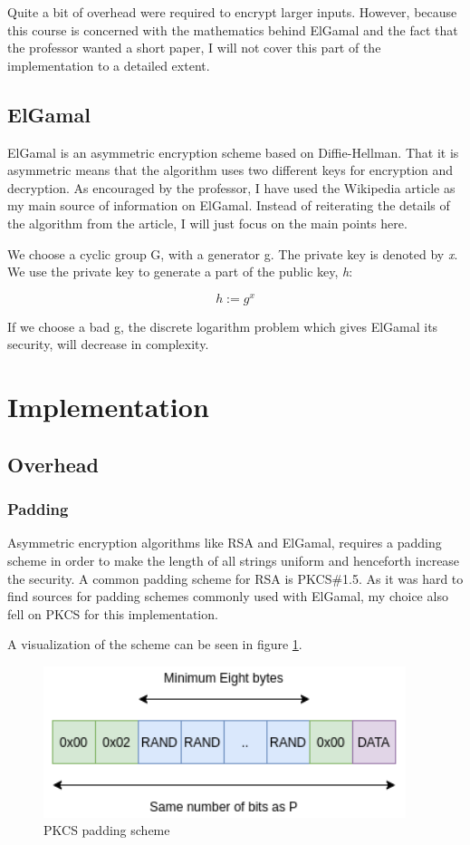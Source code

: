 \documentclass{article}
\begin{document}
Quite a bit of overhead were required to encrypt larger inputs. However, because this course is concerned with the mathematics behind ElGamal and the fact that the professor wanted a short paper, I will not cover this part of the implementation to a detailed extent. 


\subsection{ElGamal}
ElGamal is an asymmetric encryption scheme based on Diffie-Hellman. That it is asymmetric means that the algorithm uses two different keys for encryption and decryption. As encouraged by the professor, I have used the Wikipedia article\cite{WIKI} as my main source of information on ElGamal. Instead of reiterating the details of the algorithm from the article, I will just focus on the main points here. 

We choose a cyclic group G, with a generator g. The private key is denoted by \textit{x}. We use the private key to generate a part of the public key, \textit{h}:

\begin{equation}
h := g^{x}
\end{equation}

If we choose a bad g, the discrete logarithm problem which gives ElGamal its security, will decrease in complexity. 

\section{Implementation}


\subsection{Overhead}

\subsubsection{Padding}
Asymmetric encryption algorithms like RSA and ElGamal, requires a padding scheme in order to make the length of all strings uniform and henceforth increase the security. A common padding scheme for RSA is PKCS\#1.5. As it was hard to find sources for padding schemes commonly used with ElGamal, my choice also fell on PKCS for this implementation. 

A visualization of the scheme can be seen in figure \ref{rPKCS}.  


\begin{figure}[H]
 \centering
  \includegraphics[width=300pt]{img/padding.png}
 \caption{PKCS padding scheme}
 \label{rPKCS}
 \end{figure}
\end{document}
